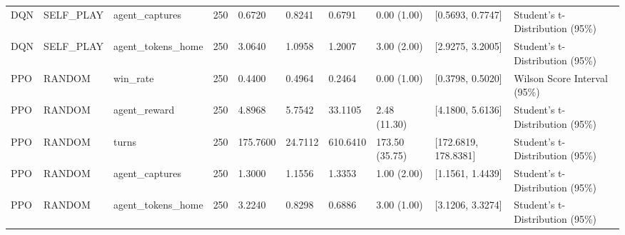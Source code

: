 \begin{table}
\begin{tabular}{llllllllll}
DQN & SELF\_PLAY & agent\_captures & 250 & 0.6720 & 0.8241 & 0.6791 & 0.00 (1.00) & [0.5693, 0.7747] & Student's t-Distribution (95\%) \\
DQN & SELF\_PLAY & agent\_tokens\_home & 250 & 3.0640 & 1.0958 & 1.2007 & 3.00 (2.00) & [2.9275, 3.2005] & Student's t-Distribution (95\%) \\
PPO & RANDOM & win\_rate & 250 & 0.4400 & 0.4964 & 0.2464 & 0.00 (1.00) & [0.3798, 0.5020] & Wilson Score Interval (95\%) \\
PPO & RANDOM & agent\_reward & 250 & 4.8968 & 5.7542 & 33.1105 & 2.48 (11.30) & [4.1800, 5.6136] & Student's t-Distribution (95\%) \\
PPO & RANDOM & turns & 250 & 175.7600 & 24.7112 & 610.6410 & 173.50 (35.75) & [172.6819, 178.8381] & Student's t-Distribution (95\%) \\
PPO & RANDOM & agent\_captures & 250 & 1.3000 & 1.1556 & 1.3353 & 1.00 (2.00) & [1.1561, 1.4439] & Student's t-Distribution (95\%) \\
PPO & RANDOM & agent\_tokens\_home & 250 & 3.2240 & 0.8298 & 0.6886 & 3.00 (1.00) & [3.1206, 3.3274] & Student's t-Distribution (95\%) \\
\bottomrule
\end{tabular}
\end{table}
